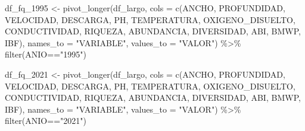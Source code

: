 \documentclass[
  10pt,
  letterpaper,
  DIV=11,
  numbers=noendperiod]{scrreprt}
\newenvironment{Shaded}{\begin{snugshade}}{\end{snugshade}}
\newcommand{\AttributeTok}[1]{\textcolor[rgb]{0.40,0.45,0.13}{#1}}
\newcommand{\FunctionTok}[1]{\textcolor[rgb]{0.28,0.35,0.67}{#1}}
\newcommand{\NormalTok}[1]{\textcolor[rgb]{0.00,0.23,0.31}{#1}}
\newcommand{\OtherTok}[1]{\textcolor[rgb]{0.00,0.23,0.31}{#1}}
\newcommand{\SpecialCharTok}[1]{\textcolor[rgb]{0.37,0.37,0.37}{#1}}
\newcommand{\StringTok}[1]{\textcolor[rgb]{0.13,0.47,0.30}{#1}}
\begin{document}
\begin{Shaded}
\begin{Highlighting}[numbers=left,,]
\NormalTok{df\_fq\_1995 }\OtherTok{\textless{}{-}} \FunctionTok{pivot\_longer}\NormalTok{(df\_largo,}
                                \AttributeTok{cols =} \FunctionTok{c}\NormalTok{(ANCHO,}
\NormalTok{                                         PROFUNDIDAD,}
\NormalTok{                                         VELOCIDAD,}
\NormalTok{                                         DESCARGA,}
\NormalTok{                                         PH,}
\NormalTok{                                         TEMPERATURA,}
\NormalTok{                                         OXIGENO\_DISUELTO,}
\NormalTok{                                         CONDUCTIVIDAD,}
\NormalTok{                                         RIQUEZA,}
\NormalTok{                                         ABUNDANCIA,}
\NormalTok{                                         DIVERSIDAD,}
\NormalTok{                                         ABI,}
\NormalTok{                                         BMWP,}
\NormalTok{                                         IBF),}
                                \AttributeTok{names\_to =} \StringTok{"VARIABLE"}\NormalTok{,}
                                \AttributeTok{values\_to =} \StringTok{"VALOR"}\NormalTok{) }\SpecialCharTok{\%\textgreater{}\%} 
    \FunctionTok{filter}\NormalTok{(ANIO}\SpecialCharTok{==}\StringTok{"1995"}\NormalTok{)}

\NormalTok{df\_fq\_2021 }\OtherTok{\textless{}{-}} \FunctionTok{pivot\_longer}\NormalTok{(df\_largo, }
                           \AttributeTok{cols =} \FunctionTok{c}\NormalTok{(ANCHO,}
\NormalTok{                                    PROFUNDIDAD,}
\NormalTok{                                    VELOCIDAD,}
\NormalTok{                                    DESCARGA,}
\NormalTok{                                    PH,}
\NormalTok{                                    TEMPERATURA,}
\NormalTok{                                    OXIGENO\_DISUELTO,}
\NormalTok{                                    CONDUCTIVIDAD,}
\NormalTok{                                    RIQUEZA,}
\NormalTok{                                    ABUNDANCIA,}
\NormalTok{                                    DIVERSIDAD,}
\NormalTok{                                    ABI,}
\NormalTok{                                    BMWP,}
\NormalTok{                                    IBF),}
                           \AttributeTok{names\_to =} \StringTok{"VARIABLE"}\NormalTok{,}
                           \AttributeTok{values\_to =} \StringTok{"VALOR"}\NormalTok{) }\SpecialCharTok{\%\textgreater{}\%} 
    \FunctionTok{filter}\NormalTok{(ANIO}\SpecialCharTok{==}\StringTok{"2021"}\NormalTok{)}



\end{Highlighting}
\end{Shaded}
\end{document}
